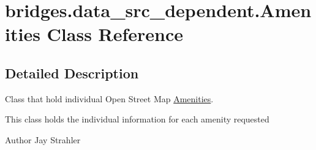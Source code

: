\hypertarget{classbridges_1_1data__src__dependent_1_1_amenities}{}\section{bridges.\+data\+\_\+src\+\_\+dependent.\+Amenities Class Reference}
\label{classbridges_1_1data__src__dependent_1_1_amenities}


\subsection{Detailed Description}
Class that hold individual Open Street Map \hyperlink{classbridges_1_1data__src__dependent_1_1_amenities}{Amenities}. 

This class holds the individual information for each amenity requested

\begin{DoxyAuthor}{Author}
Jay Strahler 
\end{DoxyAuthor}
